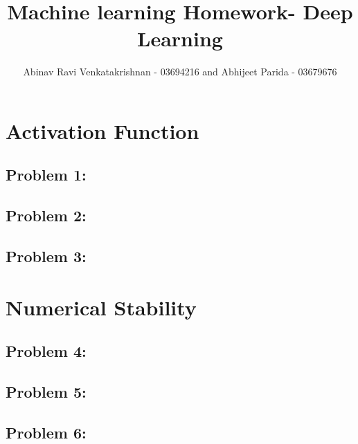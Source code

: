 \documentclass[5pt,a4paper]{article}
\begin{document}
	\title{Machine learning Homework- Deep Learning }
	\author{Abinav Ravi Venkatakrishnan - 03694216 and Abhijeet Parida - 03679676}
	\maketitle
	\section{Activation Function}
	\subsection*{Problem 1:}
	
	
	\subsection*{Problem 2:}
	
	
	\subsection*{Problem 3:}
	
	\section{ Numerical Stability}
	\subsection*{Problem 4:}
	
	\subsection*{Problem 5:}
	\subsection*{Problem 6:}
	
	
\end{document}
